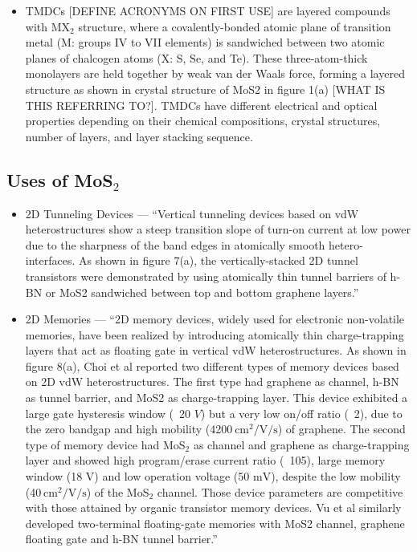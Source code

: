 \documentclass[conference]{IEEEtran}
\begin{document}
\begin{itemize}

  \item  TMDCs [DEFINE ACRONYMS ON FIRST USE] are layered compounds with MX$_2$ structure, where a covalently-bonded atomic plane of transition metal (M: groups IV to VII elements) is sandwiched between two atomic planes of chalcogen atoms (X: S, Se, and Te). These three-atom-thick monolayers are held together by weak van der Waals force, forming a layered structure as shown in crystal structure of MoS2 in figure 1(a) [WHAT IS THIS REFERRING TO?]. TMDCs have different electrical and optical properties depending on their chemical compositions, crystal structures, number of layers, and layer stacking sequence. 

\end{itemize}

\subsection{Uses of MoS$_2$}

\begin{itemize}

  \item 2D Tunneling Devices — ``Vertical tunneling devices based on vdW heterostructures show a steep transition slope of turn-on current at low power due to the sharpness of the band edges in atomically smooth hetero-interfaces. As shown in figure 7(a), the vertically-stacked 2D tunnel transistors were demonstrated by using atomically thin tunnel barriers of h-BN or MoS2 sandwiched between top and bottom graphene layers.''

  \item 2D Memories — ``2D memory devices, widely used for electronic non-volatile memories, have been realized by introducing atomically thin charge-trapping layers that act as floating gate in vertical vdW heterostructures. As shown in figure 8(a), Choi et al reported two different types of memory devices based on 2D vdW heterostructures. The first type had graphene as channel, h-BN as tunnel barrier, and MoS2 as charge-trapping layer. This device exhibited a large gate hysteresis window (~20 $\si{V}$) but a very low on/off ratio (~2), due to the zero bandgap and high mobility (4200 $\si{\centi\meter\squared\per\volt\per\second}$) of graphene. The second type of memory device had MoS$_2$ as channel and graphene as charge-trapping layer and showed high program/erase current ratio (~105), large memory window (18 $\si{\volt}$) and low operation voltage (50 $\si{\milli\volt}$), despite the low mobility (40 $\si{\centi\meter\squared\per\volt\per\second}$) of the MoS$_2$ channel. Those device parameters are competitive with those attained by organic transistor memory devices. Vu et al similarly developed two-terminal floating-gate memories with MoS2 channel, graphene floating gate and h-BN tunnel barrier.''

\end{itemize}
\end{document}
